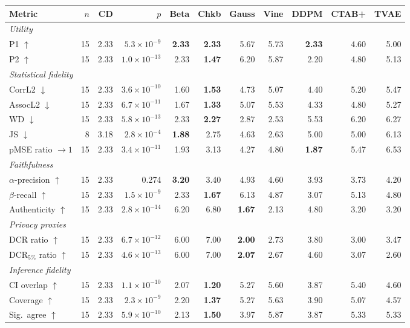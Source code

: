 \begin{tabular}{lrrrrrrrrrr}
\toprule
Metric & $n$ & CD & $p$ & Beta & Chkb & Gauss & Vine & DDPM & CTAB+ & TVAE \\
\midrule
\multicolumn{11}{l}{\emph{Utility}} \\
P1 $\uparrow$ & 15 & 2.33 & $5.3\times10^{-9}$ & \textbf{2.33} & \textbf{2.33} & 5.67 & 5.73 & \textbf{2.33} & 4.60 & 5.00 \\
P2 $\uparrow$ & 15 & 2.33 & $1.0\times10^{-13}$ & 2.33 & \textbf{1.47} & 6.20 & 5.87 & 2.20 & 4.80 & 5.13 \\
\multicolumn{11}{l}{\emph{Statistical fidelity}} \\
CorrL2 $\downarrow$ & 15 & 2.33 & $3.6\times10^{-10}$ & 1.60 & \textbf{1.53} & 4.73 & 5.07 & 4.40 & 5.20 & 5.47 \\
AssocL2 $\downarrow$ & 15 & 2.33 & $6.7\times10^{-11}$ & 1.67 & \textbf{1.33} & 5.07 & 5.53 & 4.33 & 4.80 & 5.27 \\
WD $\downarrow$ & 15 & 2.33 & $5.8\times10^{-13}$ & 2.33 & \textbf{2.27} & 2.87 & 2.53 & 5.53 & 6.20 & 6.27 \\
JS $\downarrow$ & 8 & 3.18 & $2.8\times10^{-4}$ & \textbf{1.88} & 2.75 & 4.63 & 2.63 & 5.00 & 5.00 & 6.13 \\
pMSE ratio $\to 1$ & 15 & 2.33 & $3.4\times10^{-11}$ & 1.93 & 3.13 & 4.27 & 4.80 & \textbf{1.87} & 5.47 & 6.53 \\
\multicolumn{11}{l}{\emph{Faithfulness}} \\
$\alpha$-precision $\uparrow$ & 15 & 2.33 & 0.274 & \textbf{3.20} & 3.40 & 4.93 & 4.60 & 3.93 & 3.73 & 4.20 \\
$\beta$-recall $\uparrow$ & 15 & 2.33 & $1.5\times10^{-9}$ & 2.33 & \textbf{1.67} & 6.13 & 4.87 & 3.07 & 5.13 & 4.80 \\
Authenticity $\uparrow$ & 15 & 2.33 & $2.8\times10^{-14}$ & 6.20 & 6.80 & \textbf{1.67} & 2.13 & 4.80 & 3.20 & 3.20 \\
\multicolumn{11}{l}{\emph{Privacy proxies}} \\
DCR ratio $\uparrow$ & 15 & 2.33 & $6.7\times10^{-12}$ & 6.00 & 7.00 & \textbf{2.00} & 2.73 & 3.80 & 3.00 & 3.47 \\
DCR$_{5\%}$ ratio $\uparrow$ & 15 & 2.33 & $4.6\times10^{-13}$ & 6.00 & 7.00 & \textbf{2.07} & 2.67 & 4.60 & 3.07 & 2.60 \\
\multicolumn{11}{l}{\emph{Inference fidelity}} \\
CI overlap $\uparrow$ & 15 & 2.33 & $1.1\times10^{-10}$ & 2.07 & \textbf{1.20} & 5.27 & 5.60 & 3.87 & 5.40 & 4.60 \\
Coverage $\uparrow$ & 15 & 2.33 & $2.3\times10^{-9}$ & 2.20 & \textbf{1.37} & 5.27 & 5.63 & 3.90 & 5.07 & 4.57 \\
Sig.\ agree $\uparrow$ & 15 & 2.33 & $5.9\times10^{-10}$ & 2.13 & \textbf{1.50} & 3.97 & 5.87 & 3.87 & 5.33 & 5.33 \\
\bottomrule
\end{tabular}
